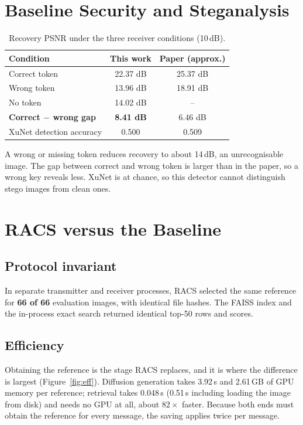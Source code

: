 \section{Baseline Security and Steganalysis}
\begin{table}[H]
	\centering
	\caption{Recovery PSNR under the three receiver conditions (10\,dB).}
	\label{tab:security}
	\begin{tabular}{|l|c|c|}
		\hline
		\textbf{Condition} & \textbf{This work} & \textbf{Paper (approx.)} \\ \hline
		Correct token & 22.37 dB & 25.37 dB \\ \hline
		Wrong token & 13.96 dB & 18.91 dB \\ \hline
		No token & 14.02 dB & -- \\ \hline
		\textbf{Correct $-$ wrong gap} & \textbf{8.41 dB} & 6.46 dB \\ \hline
		XuNet detection accuracy & 0.500 & 0.509 \\ \hline
	\end{tabular}
\end{table}

A wrong or missing token reduces recovery to about 14\,dB, an unrecognisable image. The gap
between correct and wrong token is larger than in the paper, so a wrong key reveals less. XuNet is
at chance, so this detector cannot distinguish stego images from clean ones.

\section{RACS versus the Baseline}
\subsection{Protocol invariant}
In separate transmitter and receiver processes, RACS selected the same reference for
\textbf{66 of 66} evaluation images, with identical file hashes. The FAISS index and the
in-process exact search returned identical top-50 rows and scores.

\subsection{Efficiency}
Obtaining the reference is the stage RACS replaces, and it is where the difference is largest
(Figure~\ref{fig:eff}). Diffusion generation takes 3.92\,s and 2.61\,GB of GPU memory per
reference; retrieval takes 0.048\,s (0.51\,s including loading the image from disk) and needs no
GPU at all, about $82\times$ faster. Because both ends must obtain the reference for every message,
the saving applies twice per message.


